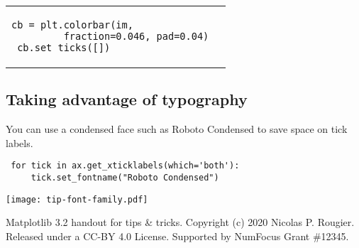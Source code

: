 \documentclass[10pt,landscape,a4paper]{article}
\begin{document}
\begin{multicols*}{3}
\begin{tabular}{@{}m{.754\linewidth}m{.236\linewidth}}
\begin{lstlisting}[belowskip=-\baselineskip]
 cb = plt.colorbar(im,
         fraction=0.046, pad=0.04)
 cb.set_ticks([])
\end{lstlisting} &
\raisebox{-0.75em}{\texttt{[image: tip-colorbar.pdf]}}
\end{tabular}

\subsection*{\rmfamily Taking advantage of typography}
You can use a condensed face such as Roboto
Condensed to save space on tick labels.
\begin{lstlisting}
 for tick in ax.get_xticklabels(which='both'):
     tick.set_fontname("Roboto Condensed")
\end{lstlisting}
\texttt{[image: tip-font-family.pdf]}


\vfill
%
{\scriptsize Matplotlib 3.2 handout for tips \& tricks.
             Copyright (c) 2020 Nicolas P. Rougier.
             Released under a CC-BY 4.0 License.
             Supported by NumFocus Grant \#12345.\par}



\end{multicols*}
\end{document}
